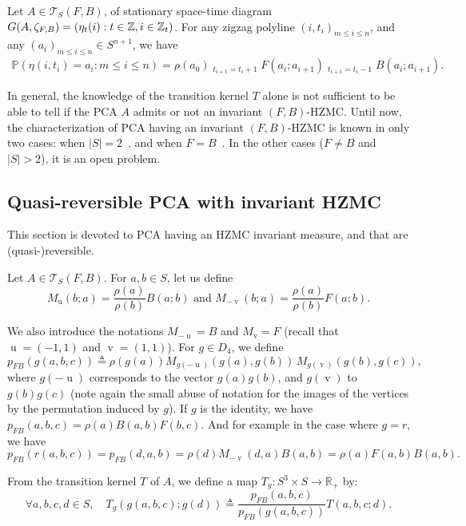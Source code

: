 \documentclass[AHL,Unicode,longabstracts]{cedram}
\newcounter{a}
\newcommand{\triang}[2]{\mathcal{T}_{#1} \left(#2 \right)}
\newcommand{\ZZ}{\mathbb{Z}}
\newcommand{\Pbb}{\mathbb{P}}
\DeclareMathOperator{\vu}{u}
\DeclareMathOperator{\vv}{v}
\newcommand{\Fh}{M_{-\vv}}
\newcommand{\Bh}{M_{\vu}}
\newcommand{\isdef}{\triangleq}
\let\oldforall\forall
\renewcommand*{\forall}{\mathrel{\oldforall}}
\begin{document}
\begin{prop}\label{prop:ind_m}
Let $A\in\triang{S}{F,B}$, of stationary space-time diagram $G(A,\linebreak\zeta_{F,B})=(\eta_t(i) : t \in \ZZ, i \in \ZZ_t)$. For any zigzag polyline $(i,t_i)_{m\leq i\leq n}$, and any $(a_i)_{m \leq i \leq n}\in S^{n+1}$, we have
\begin{align*}
\Pbb\left(\eta(i,t_i) = a_i : m \leq i \leq n\right) = \rho(a_0) \mathop{\prod_{m\in\{0,\ldots,n-1\}}}_{t_{i+1}=t_i+1} F(a_i;a_{i+1}) \mathop{\prod_{m\in\{0,\ldots,n-1\}}}_{t_{i+1}=t_i-1} B(a_i;a_{i+1}).
\end{align*}
\end{prop}

In general, the knowledge of the transition kernel $T$ alone is not sufficient to be able to tell if the PCA $A$ admits or not an invariant $(F,B)$-HZMC. Until now, the characterization of PCA having an invariant $(F,B)$-HZMC is known in only two cases: when $|S|=2$~\cite[Theorem~5.3]{Casse17}, and when $F=B$~\cite[Theorem~5.2]{Casse17}. In the other cases ($F \neq B$ and $|S|>2$), it is an open problem.

\subsection{Quasi-reversible PCA with invariant HZMC}

This section is devoted to PCA having an HZMC invariant measure, and that are (quasi-)reversible.

Let $A\in \triang{S}{F,B}$. For $a,b\in S$, let us define
\[
\Bh (b;a) = \frac{\rho(a)}{\rho(b)} B(a;b) \text{ and } \Fh (b;a) = \frac{\rho(a)}{\rho(b)} F(a;b).
\]

We also introduce the notations $M_{-\vu}=B$ and $M_{\vv}=F$ (recall that $\vu=(-1,1)$ and $\vv=(1,1)$). For $g\in D_4$, we define
\[
p_{FB}(g(a,b,c))\isdef \rho(g(a))M_{g(-\vu)}(g(a),g(b))\,M_{g(\vv)}(g(b),g(c)),
\]
where $g(-\vu)$ corresponds to the vector $g(a)g(b)$, and $g(\vv)$ to $g(b)g(c)$ (note again the small abuse of notation for the images of the vertices by the permutation induced by $g$). If $g$ is the identity, we have $p_{FB}(a,b,c)=\rho(a)B(a,b)F(b,c).$ And for example in the case where $g=r$, we have
\[
p_{FB}(r(a,b,c))=p_{FB}(d,a,b)=\rho(d)M_{-\vv}(d,a)B(a,b)=\rho(a)F(a,b)B(a,b).
\]

From the transition kernel $T$ of $A$, we define a map $T_g: S^3 \times S\to \mathbb R_+$ by:
\[
\forall a,b,c,d\in S, \quad T_g(g(a,b,c);g(d))\isdef\frac{p_{FB}(a,b,c)}{p_{FB}(g(a,b,c))}T(a,b,c;d).
\]
\end{document}

